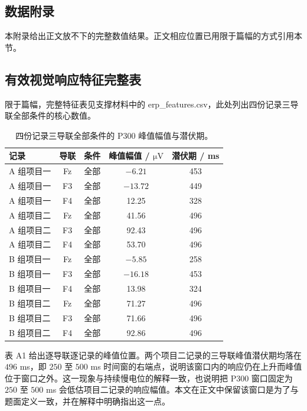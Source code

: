 \documentclass[bwprint]{gmcmthesis}
\begin{document}
\clearpage
\label{appendix:start}
\begin{appendices}

\section{数据附录}

本附录给出正文放不下的完整数值结果。正文相应位置已用限于篇幅的方式引用本节。

\subsection{有效视觉响应特征完整表}

限于篇幅，完整特征表见支撑材料中的 erp\_features.csv，此处列出四份记录三导联全部条件的核心数值。

\begin{table}[htp!]
\centering
\renewcommand\arraystretch{1.2}
\caption{四份记录三导联全部条件的 P300 峰值幅值与潜伏期。}
\begin{tabular}{|l|c|c|c|c|}
  \hline
  记录 & 导联 & 条件 & 峰值幅值 / $\si{\micro\volt}$ & 潜伏期 / ms \\
  \hline
  A 组项目一 & Fz & 全部 & $-6.21$ & 453 \\
  \hline
  A 组项目一 & F3 & 全部 & $-13.72$ & 449 \\
  \hline
  A 组项目一 & F4 & 全部 & 12.25 & 328 \\
  \hline
  A 组项目二 & Fz & 全部 & 41.56 & 496 \\
  \hline
  A 组项目二 & F3 & 全部 & 92.43 & 496 \\
  \hline
  A 组项目二 & F4 & 全部 & 53.70 & 496 \\
  \hline
  B 组项目一 & Fz & 全部 & $-5.85$ & 258 \\
  \hline
  B 组项目一 & F3 & 全部 & $-16.18$ & 453 \\
  \hline
  B 组项目一 & F4 & 全部 & 13.98 & 324 \\
  \hline
  B 组项目二 & Fz & 全部 & 71.27 & 496 \\
  \hline
  B 组项目二 & F3 & 全部 & 71.66 & 496 \\
  \hline
  B 组项目二 & F4 & 全部 & 92.86 & 496 \\
  \hline
\end{tabular}
\end{table}

表 A1 给出逐导联逐记录的峰值位置。两个项目二记录的三导联峰值潜伏期均落在 $496$ ms，即 $250$ 至 $500$ ms 时间窗的右端点，说明该窗口内的响应仍在上升而峰值位于窗口之外。这一现象与持续慢电位的解释一致，也说明把 P300 窗口固定为 $250$ 至 $500$ ms 会低估项目二记录的响应幅值。本文在正文中保留该窗口是为了与题面定义一致，并在解释中明确指出这一点。


\end{appendices}
\end{document}
